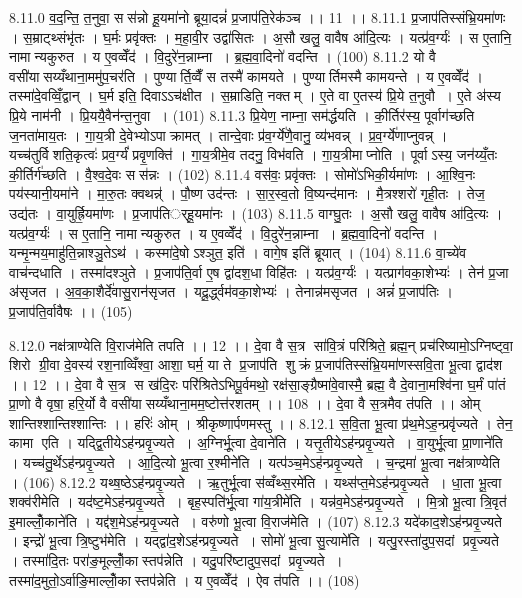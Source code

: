 8.11.0
व॒द॒न्ति॒ त॒नुवा॒ सस॑न्नो हू॒यमा॑नो ब्रूया॒दन्नं॑ प्र॒जाप॑ति॒रेक॑ञ्च ।। 11 ।।
8.11.1
प्र॒जाप॑तिस्संभ्रि॒यमा॑णः । स॒म्राट्थ्संभृ॑तः । घ॒र्मः प्रवृ॑क्तः । म॒हा॒वी॒र उद्वा॑सितः । अ॒सौ खलु॒ वावैष आ॑दि॒त्यः । यत्प्र॑व॒र्ग्यः॑ । स ए॒तानि॒ नामान्यकुरुत । य ए॒वव्वेँद॑ । वि॒दुरे॑न॒न्नाम्ना । ब्र॒ह्म॒वा॒दिनो॑ वदन्ति । (100)
8.11.2
यो वै वसी॑यासय्यँथाना॒ममु॑प॒चर॑ति । पुण्यार्ति॒व्वैँ स तस्मै॑ कामयते । पुण्यार्तिमस्मै कामयन्ते । य ए॒वव्वेँद॑ । तस्मा॑दे॒वव्विँ॒द्वान् । घ॒र्म इति॒ दिवाऽऽच॑क्षीत । स॒म्राडिति॒ नक्तम् । ए॒ते वा ए॒तस्य॑ प्रि॒ये त॒नुवौ । ए॒ते अ॑स्य प्रि॒ये नाम॑नी । प्रि॒ययै॒वैन॑न्त॒नुवा । (101)
8.11.3
प्रि॒येण॒ नाम्ना॒ सम॑र्द्धयति । की॒र्तिर॑स्य॒ पूर्वाग॑च्छति ज॒नता॑माय॒तः । गा॒य॒त्री दे॒वेभ्योऽपाक्रामत् । तान्दे॒वाः प्र॑व॒र्ग्ये॑णै॒वानु॒ व्य॑भवन्न् । प्र॒व॒र्ग्ये॑णाप्नुवन्न् । यच्च॑तुर्विशति॒कृत्वः॑ प्रव॒र्ग्यं॑ प्रवृ॒णक्ति॑ । गा॒य॒त्रीमे॒व तदनु॒ विभ॑वति । गा॒य॒त्रीमाप्नोति । पूर्वाऽस्य॒ जन॑य्यँ॒तः की॒र्तिर्ग॑च्छति । वै॒श्व॒दे॒वः सस॑न्नः । (102)
8.11.4
वस॑वः॒ प्रवृ॑क्तः । सोमो॑ऽभिकी॒र्यमा॑णः । आ॒श्वि॒नः पय॑स्यानी॒यमा॑ने । मा॒रु॒तः क्वथन्न्॑ । पौ॒ष्ण उद॑न्तः । सा॒र॒स्व॒तो वि॒ष्यन्द॑मानः । मै॒त्रश्शरो॑ गृही॒तः । तेज॒ उद्य॑तः । वा॒युर्ह्रि॒यमा॑णः । प्र॒जाप॑तिर््हू॒यमा॑नः । (103)
8.11.5
वाग्घु॒तः । अ॒सौ खलु॒ वावैष आ॑दि॒त्यः । यत्प्र॑व॒र्ग्यः॑ । स ए॒तानि॒ नामान्यकुरुत । य ए॒वव्वेँद॑ । वि॒दुरे॑न॒न्नाम्ना । ब्र॒ह्म॒वा॒दिनो॑ वदन्ति । यन्मृ॒न्मय॒माहु॑ति॒न्नाश्ञु॒तेऽथ॑ । कस्मा॑दे॒षोऽश्ञुत॒ इति॑ । वागे॒ष इति॑ ब्रूयात् । (104)
8.11.6
वा॒च्ये॑व वाच॑न्दधाति । तस्मा॑दश्ञुते । प्र॒जाप॑ति॒र्वा ए॒ष द्वा॑दश॒धा विहि॑तः । यत्प्र॑व॒र्ग्यः॑ । यत्प्राग॑वका॒शेभ्यः॑ । तेन॑ प्र॒जा अ॑सृजत । अ॒व॒का॒शैर्दे॑वासु॒रान॑सृजत । यदू॒र्द्ध्वम॑वका॒शेभ्यः॑ । तेनान्न॑मसृजत । अन्नं॑ प्र॒जाप॑तिः । प्र॒जाप॑ति॒र्वावैषः ।। (105)
\anuvakamend

8.12.0
नक्ष॑त्राण्येति वि॒राज॑मेति तपति ।। 12 ।। दे॒वा वै स॒त्र सा॑वि॒त्रं परि॑श्रिते॒ ब्रह्म॒न् प्रच॑रिष्यामो॒ऽग्निष्ट्वा॒ शिरो ग्री॒वा दे॒वस्य॑ रश॒नाव्विँश्वा॒ आशा॒ घर्म॒ या ते प्र॒जाप॑ति शुक्रं प्र॒जाप॑तिस्संभ्रि॒यमा॑णस्सवि॒ता भू॒त्वा द्वाद॑श ।। 12 ।। दे॒वा वै स॒त्र स ख॑दि॒रः परि॑श्रितेऽभिपू॒र्वमथो॒ रक्ष॑सा॒ङ्ग्रैष्मा॑वे॒वास्मै॒ ब्रह्म॒ वै दे॒वाना॒मश्वि॑ना घ॒र्मं पा॑तं प्रा॒णो वै वृषा॒ हरि॒र्यो वै वसी॑यासय्यँथाना॒मम॒ष्टोत्त॑रशतम् ।। 108 ।। दे॒वा वै स॒त्रमैव त॑पति ।। ओम् शान्तिश्शान्तिश्शान्तिः ।। हरिः॑ ओम् । श्रीकृष्णार्पणमस्तु ।।
8.12.1
स॒वि॒ता भू॒त्वा प्र॑थ॒मेऽह॒न्प्रवृ॑ज्यते । तेन॒ कामा एति । यद्द्वि॒तीयेऽह॑न्प्रवृ॒ज्यते । अ॒ग्निर्भू॒त्वा दे॒वाने॑ति । यत्तृ॒तीयेऽह॑न्प्रवृ॒ज्यते । वा॒युर्भू॒त्वा प्रा॒णाने॑ति । यच्च॑तु॒र्थेऽह॑न्प्रवृ॒ज्यते । आ॒दि॒त्यो भू॒त्वा र॒श्मीने॑ति । यत्प॑ञ्च॒मेऽह॑न्प्रवृ॒ज्यते । च॒न्द्रमा॑ भू॒त्वा नक्ष॑त्राण्येति । (106)
8.12.2
यथ्ष॒ष्ठेऽह॑न्प्रवृ॒ज्यते । ऋ॒तुर्भू॒त्वा स॑व्वँथ्स॒रमे॑ति । यथ्स॑प्त॒मेऽह॑न्प्रवृ॒ज्यते । धा॒ता भू॒त्वा शक्व॑रीमेति । यद॑ष्ट॒मेऽह॑न्प्रवृ॒ज्यते । बृह॒स्पति॑र्भू॒त्वा गा॑य॒त्रीमे॑ति । यन्न॑व॒मेऽह॑न्प्रवृ॒ज्यते । मि॒त्रो भू॒त्वा त्रि॒वृत॑ इ॒माल्लोँ॒काने॑ति । यद्द॑श॒मेऽह॑न्प्रवृ॒ज्यते । वरु॑णो भू॒त्वा वि॒राज॑मेति । (107)
8.12.3
यदे॑काद॒शेऽह॑न्प्रवृ॒ज्यते । इन्द्रो॑ भू॒त्वा त्रि॒ष्टुभ॑मेति । यद्द्वा॑द॒शेऽह॑न्प्रवृ॒ज्यते । सोमो॑ भू॒त्वा सु॒त्यामे॑ति । यत्पु॒रस्ता॑दुप॒सदां प्रवृ॒ज्यते । तस्मा॑दि॒तः परा॑ङ॒मूल्लोँ॒कास्तप॑न्नेति । यदु॒परि॑ष्टादुप॒सदां प्रवृ॒ज्यते । तस्मा॑द॒मुतो॒ऽर्वाङि॒माल्लोँ॒कास्तप॑न्नेति । य ए॒वव्वेँद॑ । ऐव त॑पति ।। (108)

